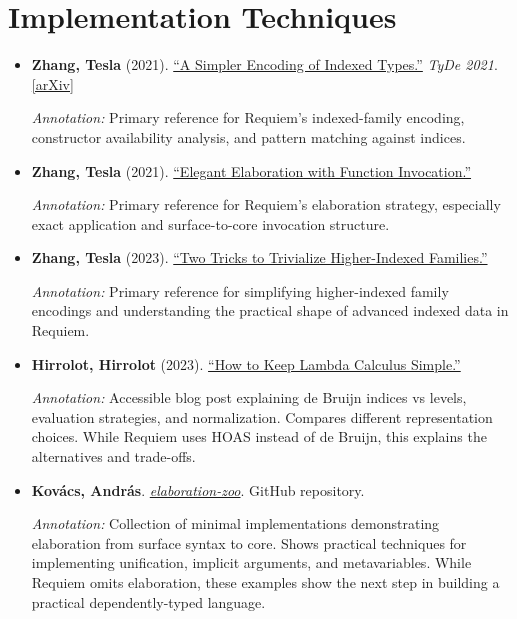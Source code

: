 \documentclass[11pt]{article}
\begin{document}
\section{Implementation Techniques}

\begin{itemize}[leftmargin=*]
\item \textbf{Zhang, Tesla} (2021). \href{https://doi.org/10.1145/3471875.3472991}{``A Simpler Encoding of Indexed Types.''} \emph{TyDe 2021}. \href{https://arxiv.org/abs/2103.15408}{[arXiv]}

\textit{Annotation:} Primary reference for Requiem's indexed-family encoding, constructor availability analysis, and pattern matching against indices.

\item \textbf{Zhang, Tesla} (2021). \href{https://arxiv.org/abs/2105.14840}{``Elegant Elaboration with Function Invocation.''}

\textit{Annotation:} Primary reference for Requiem's elaboration strategy, especially exact application and surface-to-core invocation structure.

\item \textbf{Zhang, Tesla} (2023). \href{https://arxiv.org/abs/2309.14187}{``Two Tricks to Trivialize Higher-Indexed Families.''}

\textit{Annotation:} Primary reference for simplifying higher-indexed family encodings and understanding the practical shape of advanced indexed data in Requiem.

\item \textbf{Hirrolot, Hirrolot} (2023). \href{https://hirrolot.github.io/posts/how-to-keep-lambda-calculus-simple.html}{``How to Keep Lambda Calculus Simple.''}

\textit{Annotation:} Accessible blog post explaining de Bruijn indices vs levels, evaluation strategies, and normalization. Compares different representation choices. While Requiem uses HOAS instead of de Bruijn, this explains the alternatives and trade-offs.

\item \textbf{Kovács, András}. \href{https://github.com/AndrasKovacs/elaboration-zoo}{\emph{elaboration-zoo}}. GitHub repository.

\textit{Annotation:} Collection of minimal implementations demonstrating elaboration from surface syntax to core. Shows practical techniques for implementing unification, implicit arguments, and metavariables. While Requiem omits elaboration, these examples show the next step in building a practical dependently-typed language.

\end{itemize}
\end{document}
